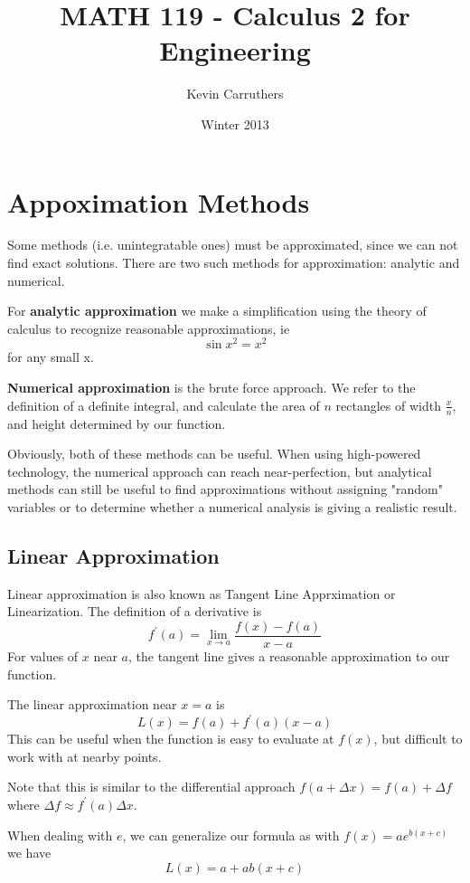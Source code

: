 \documentclass[12pt]{article}
\begin{document}
\title{MATH 119 - Calculus 2 for Engineering}
\author{Kevin Carruthers}
\date{\vspace{-2ex}Winter 2013}
\maketitle\HRule

\section*{Appoximation Methods}
Some methods (i.e. unintegratable ones) must be approximated, since we can not find exact solutions. There are two such methods for approximation: analytic and numerical.

For {\bf analytic approximation} we make a simplification using the theory of calculus to recognize reasonable approximations, ie \[ \sin x^2 = x^2 \] for any small x.

{\bf Numerical approximation} is the brute force approach. We refer to the definition of a definite integral, and calculate the area of $n$ rectangles of width $\frac{x}{n}$, and height determined by our function.

Obviously, both of these methods can be useful. When using high-powered technology, the numerical approach can reach near-perfection, but analytical methods can still be useful to find approximations without assigning "random" variables or to determine whether a numerical analysis is giving a realistic result.

\subsection*{Linear Approximation}
Linear approximation is also known as Tangent Line Apprximation or Linearization. The definition of a derivative is \[ f^\prime(a) = \lim_{x\to a} \frac{f(x) - f(a)}{x - a} \] For values of $x$ near $a$, the tangent line gives a reasonable approximation to our function.

The linear approximation near $x = a$ is \[ L(x) = f(a) + f^\prime(a)(x-a) \] This can be useful when the function is easy to evaluate at $f(x)$, but difficult to work with at nearby points.

Note that this is similar to the differential approach $f(a + \Delta x) = f(a) + \Delta f$ where $\Delta f \approx f^\prime (a) \Delta x$.

When dealing with $e$, we can generalize our formula as with $f(x) = ae^{b(x+c)}$ we have \[ L(x) = a + ab(x+c) \]
\end{document}
